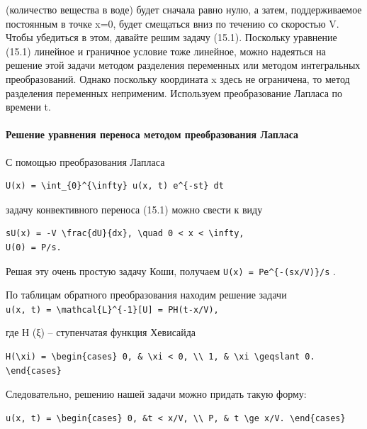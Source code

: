 \documentclass[
  ukrainian,
]{article}
\begin{document}
(количество вещества в воде) будет сначала равно нулю, а затем,
поддерживаемое постоянным в точке x=0, будет смещаться вниз по течению
со скоростью V. Чтобы убедиться в этом, давайте решим задачу (15.1).
Поскольку уравнение (15.1) линейное и граничное условие тоже линейное,
можно надеяться на решение этой задачи методом разделения переменных или
методом интегральных преобразований. Однако поскольку координата x здесь
не ограничена, то метод разделения переменных неприменим. Используем
преобразование Лапласа по времени t.

\paragraph{Решение уравнения переноса методом преобразования
Лапласа}\label{ux440ux435ux448ux435ux43dux438ux435-ux443ux440ux430ux432ux43dux435ux43dux438ux44f-ux43fux435ux440ux435ux43dux43eux441ux430-ux43cux435ux442ux43eux434ux43eux43c-ux43fux440ux435ux43eux431ux440ux430ux437ux43eux432ux430ux43dux438ux44f-ux43bux430ux43fux43bux430ux441ux430}

С помощью преобразования Лапласа

\begin{verbatim}
U(x) = \int_{0}^{\infty} u(x, t) e^{-st} dt
\end{verbatim}

задачу конвективного переноса (15.1) можно свести к виду

\begin{verbatim}
sU(x) = -V \frac{dU}{dx}, \quad 0 < x < \infty,
U(0) = P/s.
\end{verbatim}

Решая эту очень простую задачу Коши, получаем
\texttt{U(x)\ =\ Pe\^{}\{-(sx/V)\}/s} .

По таблицам обратного преобразования находим решение задачи
\texttt{u(x,\ t)\ =\ \textbackslash{}mathcal\{L\}\^{}\{-1\}{[}U{]}\ =\ PH(t-x/V),}

где Н (ξ) -- ступенчатая функция Хевисайда

\begin{verbatim}
H(\xi) = \begin{cases} 0, & \xi < 0, \\ 1, & \xi \geqslant 0. \end{cases}
\end{verbatim}

Следовательно, решению нашей задачи можно придать такую форму:

\begin{verbatim}
u(x, t) = \begin{cases} 0, &t < x/V, \\ P, & t \ge x/V. \end{cases}
\end{verbatim}
\end{document}
